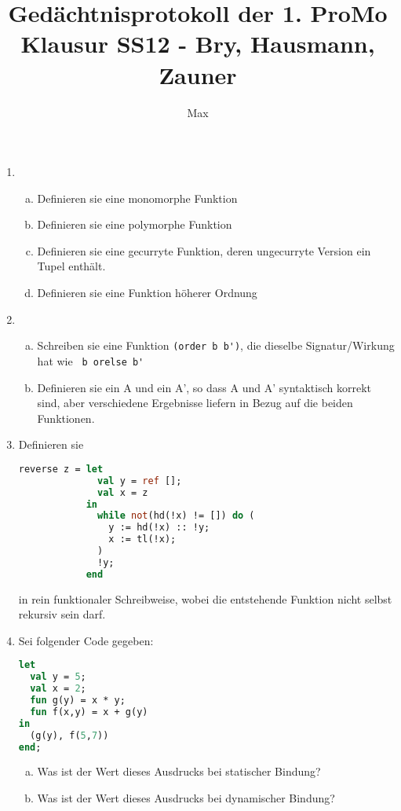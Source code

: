 \documentclass{article}
\begin{document}
\title{Gedächtnisprotokoll der 1. ProMo Klausur SS12 - Bry, Hausmann, Zauner}
\author{Max}
\maketitle
\begin{enumerate}[1)]
	\item 
    \begin{enumerate}[a)]
      \item Definieren sie eine monomorphe Funktion
      \item Definieren sie eine polymorphe Funktion
      \item Definieren sie eine gecurryte Funktion, deren ungecurryte Version ein Tupel enthält.
      \item Definieren sie eine Funktion höherer Ordnung
    \end{enumerate}
	\item  
    \begin{enumerate}[a)]
      \item Schreiben sie eine Funktion \verb|(order b b')|, die dieselbe Signatur/Wirkung hat wie \verb| b orelse b'|
      \item Definieren sie ein A und ein A', so dass A und A' syntaktisch korrekt sind, aber verschiedene Ergebnisse liefern in Bezug auf die beiden Funktionen.
    \end{enumerate}
	\item Definieren sie 
    \begin{lstlisting}[language=ML]
reverse z = let 
              val y = ref [];
              val x = z
            in
              while not(hd(!x) != []) do (
                y := hd(!x) :: !y;
                x := tl(!x);
              )
              !y;
            end 
    \end{lstlisting}
    in rein funktionaler Schreibweise, wobei die entstehende Funktion nicht selbst rekursiv sein darf.
	\item 
    Sei folgender Code gegeben:
 \begin{lstlisting}[language=ML]
let 
  val y = 5; 
  val x = 2;
  fun g(y) = x * y; 
  fun f(x,y) = x + g(y)
in
  (g(y), f(5,7))
end;
    \end{lstlisting}
    \begin{enumerate}[a)]
      \item  Was ist der Wert dieses Ausdrucks bei statischer Bindung?
      \item  Was ist der Wert dieses Ausdrucks bei dynamischer Bindung?

\end{enumerate}
\end{enumerate}
\end{document}
